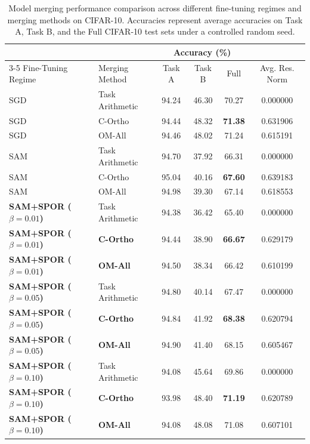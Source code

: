 \documentclass{article}
\theoremstyle{plain}
\theoremstyle{definition}
\theoremstyle{remark}
\begin{document}
\begin{table}[t]
\caption{Model merging performance comparison across different fine-tuning regimes and merging methods on CIFAR-10. Accuracies represent average accuracies on Task A, Task B, and the Full CIFAR-10 test sets under a controlled random seed.}
\label{table:results}
\vskip 0.1in
\begin{center}
\begin{small}
\begin{sc}
\begin{tabular}{llcccc}
\toprule
& & \multicolumn{3}{c}{Accuracy (\%)} & \\
\cmidrule(r){3-5}
Fine-Tuning Regime & Merging Method & Task A & Task B & Full & Avg. Res. Norm \\
\midrule
SGD & Task Arithmetic & 94.24 & 46.30 & 70.27 & 0.000000 \\
SGD & C-Ortho & 94.44 & 48.32 & \textbf{71.38} & 0.631906 \\
SGD & OM-All & 94.46 & 48.02 & 71.24 & 0.615191 \\
\midrule
SAM & Task Arithmetic & 94.70 & 37.92 & 66.31 & 0.000000 \\
SAM & C-Ortho & 95.04 & 40.16 & \textbf{67.60} & 0.639183 \\
SAM & OM-All & 94.98 & 39.30 & 67.14 & 0.618553 \\
\midrule
\textbf{SAM+SPOR ($\beta=0.01$)} & Task Arithmetic & 94.38 & 36.42 & 65.40 & 0.000000 \\
\textbf{SAM+SPOR ($\beta=0.01$)} & \textbf{C-Ortho} & 94.44 & 38.90 & \textbf{66.67} & 0.629179 \\
\textbf{SAM+SPOR ($\beta=0.01$)} & \textbf{OM-All} & 94.50 & 38.34 & 66.42 & 0.610199 \\
\midrule
\textbf{SAM+SPOR ($\beta=0.05$)} & Task Arithmetic & 94.80 & 40.14 & 67.47 & 0.000000 \\
\textbf{SAM+SPOR ($\beta=0.05$)} & \textbf{C-Ortho} & 94.84 & 41.92 & \textbf{68.38} & 0.620794 \\
\textbf{SAM+SPOR ($\beta=0.05$)} & \textbf{OM-All} & 94.90 & 41.40 & 68.15 & 0.605467 \\
\midrule
\textbf{SAM+SPOR ($\beta=0.10$)} & Task Arithmetic & 94.08 & 45.64 & 69.86 & 0.000000 \\
\textbf{SAM+SPOR ($\beta=0.10$)} & \textbf{C-Ortho} & 93.98 & 48.40 & \textbf{71.19} & 0.620789 \\
\textbf{SAM+SPOR ($\beta=0.10$)} & \textbf{OM-All} & 94.08 & 48.08 & 71.08 & 0.607101 \\

\end{tabular}
\end{sc}
\end{small}
\end{center}
\end{table}
\end{document}
